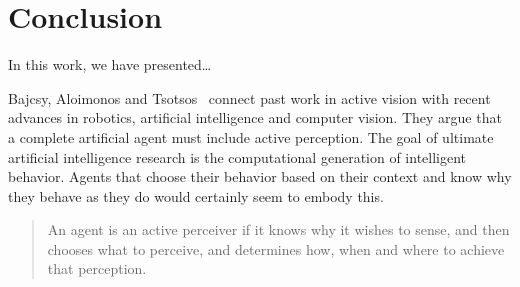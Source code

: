 \chapter{Conclusion}
\label{cha:conclusion}

% 

In this work, we have presented\dots

Bajcsy, Aloimonos and Tsotsos~\cite{bajcsy_revisiting_2018} connect past work in active vision with recent advances in robotics, artificial intelligence and computer vision.
They argue that a complete artificial agent must include active perception.
The goal of ultimate artificial intelligence research is the computational generation of intelligent behavior.
Agents that choose their behavior based on their context and know why they behave as they do would certainly seem to embody this.

\begin{quote}
    An agent is an active perceiver if it knows why it wishes to sense,
    and then chooses what to perceive, and determines how, when and where to achieve that perception.
\end{quote}
